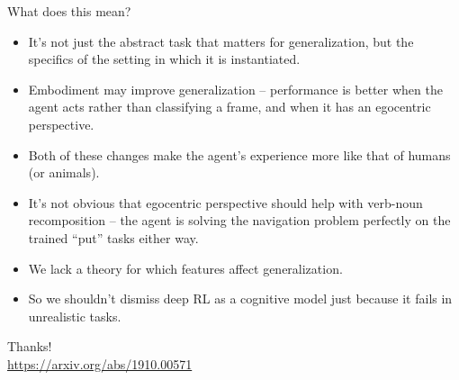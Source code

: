 \documentclass{beamer}
\begin{document}
\begin{frame}{What does this mean?}
\begin{itemize}[<+->]
\item It's not just the abstract task that matters for generalization, but the specifics of the setting in which it is instantiated. 
\item Embodiment may improve generalization -- performance is better when the agent acts rather than classifying a frame, and when it has an egocentric perspective.
\item Both of these changes make the agent's experience more like that of humans (or animals).
\item It's not obvious that egocentric perspective should help with verb-noun recomposition -- the agent is solving the navigation problem perfectly on the trained ``put'' tasks either way.
\item We lack a theory for which features affect generalization.
\item So we shouldn't dismiss deep RL as a cognitive model just because it fails in unrealistic tasks. 
\end{itemize}
\end{frame}

\begin{frame}[standout]
Thanks!\\
\url{https://arxiv.org/abs/1910.00571}
\end{frame}
\end{document}
